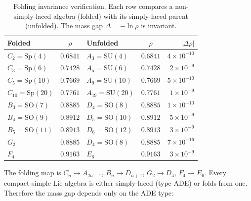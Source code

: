 \documentclass[11pt,a4paper]{article}
\let\hline\midrule
\theoremstyle{definition}
\theoremstyle{remark}
\newcommand{\SU}{\mathrm{SU}}
\begin{document}
\begin{table}[h]
\centering
\caption{Folding invariance verification. Each row compares a non-simply-laced algebra (folded) with its simply-laced parent (unfolded). The mass gap $\Delta=-\ln\rho$ is invariant.}\label{tab:folding}
\begin{tabular}{lclcr}
\hline
Folded & $\rho$ & Unfolded & $\rho$ & $|\Delta\rho|$ \\
\hline
$C_2=\mathrm{Sp}(4)$ & $0.6841$ & $A_3=\SU(4)$ & $0.6841$ & $4\times 10^{-10}$ \\
$C_3=\mathrm{Sp}(6)$ & $0.7428$ & $A_5=\SU(6)$ & $0.7428$ & $2\times 10^{-9}$ \\
$C_5=\mathrm{Sp}(10)$ & $0.7669$ & $A_9=\SU(10)$ & $0.7669$ & $5\times 10^{-10}$ \\
$C_{10}=\mathrm{Sp}(20)$ & $0.7761$ & $A_{19}=\SU(20)$ & $0.7761$ & $1\times 10^{-9}$ \\
$B_3=\mathrm{SO}(7)$ & $0.8885$ & $D_4=\mathrm{SO}(8)$ & $0.8885$ & $1\times 10^{-10}$ \\
$B_4=\mathrm{SO}(9)$ & $0.8912$ & $D_5=\mathrm{SO}(10)$ & $0.8912$ & $5\times 10^{-9}$ \\
$B_5=\mathrm{SO}(11)$ & $0.8913$ & $D_6=\mathrm{SO}(12)$ & $0.8913$ & $3\times 10^{-9}$ \\
$G_2$ & $0.8885$ & $D_4=\mathrm{SO}(8)$ & $0.8885$ & $7\times 10^{-16}$ \\
$F_4$ & $0.9163$ & $E_6$ & $0.9163$ & $3\times 10^{-9}$ \\
\hline
\end{tabular}
\end{table}

The folding map is $C_n\to A_{2n-1}$, $B_n\to D_{n+1}$, $G_2\to D_4$, $F_4\to E_6$. Every compact simple Lie algebra is either simply-laced (type ADE) or folds from one. Therefore the mass gap depends only on the ADE type:
\end{document}
